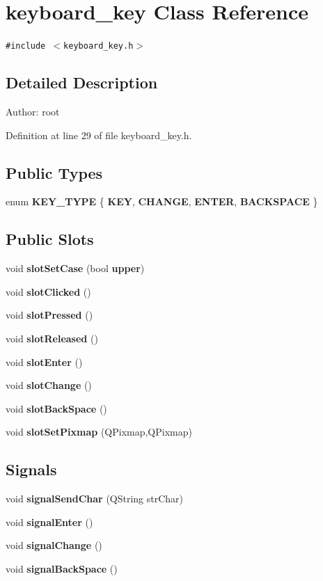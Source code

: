 \section{keyboard\_\-key Class Reference}
\label{classkeyboard__key}
{\tt \#include $<$keyboard\_\-key.h$>$}



\subsection{Detailed Description}
\begin{Desc}
\item[Author:]root \end{Desc}




Definition at line 29 of file keyboard\_\-key.h.\subsection*{Public Types}
\begin{CompactItemize}
\item 
enum {\bf KEY\_\-TYPE} \{ {\bf KEY}, 
{\bf CHANGE}, 
{\bf ENTER}, 
{\bf BACKSPACE}
 \}
\end{CompactItemize}
\subsection*{Public Slots}
\begin{CompactItemize}
\item 
void {\bf slot\-Set\-Case} (bool {\bf upper})
\item 
void {\bf slot\-Clicked} ()
\item 
void {\bf slot\-Pressed} ()
\item 
void {\bf slot\-Released} ()
\item 
void {\bf slot\-Enter} ()
\item 
void {\bf slot\-Change} ()
\item 
void {\bf slot\-Back\-Space} ()
\item 
void {\bf slot\-Set\-Pixmap} (QPixmap,QPixmap)
\end{CompactItemize}
\subsection*{Signals}
\begin{CompactItemize}
\item 
void {\bf signal\-Send\-Char} (QString str\-Char)
\item 
void {\bf signal\-Enter} ()
\item 
void {\bf signal\-Change} ()
\item 
void {\bf signal\-Back\-Space} ()
\end{CompactItemize}
